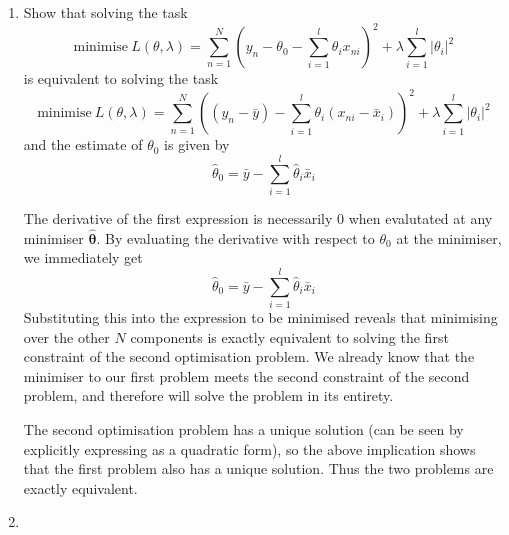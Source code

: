 \documentclass{article}
\newcommand{\chapternumber}{3}
\newenvironment{QandA}{\begin{enumerate}[label=\chapternumber.\arabic*]\bfseries\boldmath}
	{\end{enumerate}}
\newenvironment{answered}{\par\bigskip\normalfont\unboldmath}{}
\begin{document}
\begin{QandA}
		\item Show that solving the task 
		\[\text{minimise}\ L(\theta,\lambda)=\sum_{n=1}^N\left(y_n-\theta_0-\sum_{i=1}^l\theta_i x_{ni}\right)^2+\lambda\sum_{i=1}^l|\theta_i|^2\]
		is equivalent to solving the task
		\[\text{minimise}\ L(\theta,\lambda)=\sum_{n=1}^N\left((y_n-\bar{y})-\sum_{i=1}^l\theta_i (x_{ni}-\bar{x}_i)\right)^2+\lambda\sum_{i=1}^l|\theta_i|^2\]
		and the estimate of $\theta_0$ is given by
		\[\hat{\theta}_0=\bar{y}-\sum_{i=1}^l\hat{\theta}_i\bar{x}_i\]
		
		\begin{answered}
			The derivative of the first expression is necessarily 0 when evalutated at any minimiser ${\boldsymbol{\hat{\theta}}}$. By evaluating the derivative with respect to $\theta_0$ at the minimiser, we immediately get
			\[\hat{\theta}_0=\bar{y}-\sum_{i=1}^l\hat{\theta}_i\bar{x}_i\]
			Substituting this into the expression to be minimised reveals that minimising over the other $N$ components is exactly equivalent to solving the first constraint of the second optimisation problem. We already know that the minimiser to our first problem meets the second constraint of the second problem, and therefore will solve the problem in its entirety.
			
			The second optimisation problem has a unique solution (can be seen by explicitly expressing as a quadratic form), so the above implication shows that the first problem also has a unique solution. Thus the two problems are exactly equivalent.
		\end{answered}
	
		\item
		
		
	\end{QandA}
	
\end{document}
